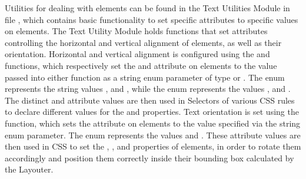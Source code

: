 Utilities for dealing with  elements can be found in the
Text Utilities Module in file , which contains
basic functionality to set specific  attributes to
specific values on  elements. The Text Utility Module
holds functions that set  attributes controlling the
horizontal and vertical alignment of  elements, as well
as their orientation.  Horizontal and vertical alignment is configured
using the  and 
functions, which respectively set the  and
 attribute on  elements to the value
passed into either function as a string enum parameter of type
 or .  The
 enum represents the string values
,  and , while the
 enum represents the values ,
 and .  The distinct
 and  attribute values are then
used in Selectors of various CSS rules to declare different values for
the  and  properties.  Text
orientation is set using the  function, which
sets the  attribute on  elements
to the value specified via the  string enum
parameter.  The  enum represents the values
 and .  These
 attribute values are then used in CSS to set
the , , and 
properties of  elements, in order to rotate them
accordingly and position them correctly inside their bounding box
calculated by the Layouter.


